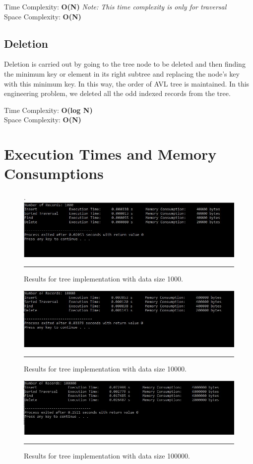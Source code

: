 	Time Complexity: \textbf{O(N)}   \textit{Note: This time complexity is only for traversal}\\
	Space Complexity: \textbf{O(N)}
	
	\subsection{Deletion}
	Deletion is carried out by going to the tree node to be deleted and then finding the minimum key or element in its right subtree and replacing the node's key with this minimum key. In this way, the order of AVL tree is maintained. In this engineering problem, we deleted all the odd indexed records from the tree.
	
	Time Complexity: \textbf{O(log N)} \\
	Space Complexity: \textbf{O(N)}
	
\section{Execution Times and Memory Consumptions}
\begin{figure}[H].
	\centering
	\includegraphics[scale =0.7]{./Figures/Tree1000.jpg}
	\rule{35em}{0.5pt}
	\caption{Results for tree implementation with data size 1000.}
	\label{fig:Tree 1000}
\end{figure}

\begin{figure}[H]
	\centering
	\includegraphics[scale =0.7]{./Figures/Tree10000.jpg}
	\rule{35em}{0.5pt}
	\caption{Results for tree implementation with data size 10000.}
	\label{fig:Tree 10000}
\end{figure}

\begin{figure}[H]
	\centering
	\includegraphics[scale =0.7]{./Figures/Tree100000.jpg}
	\rule{35em}{0.5pt}
	\caption{Results for tree implementation with data size 100000.}
	\label{fig:Tree 100000}
\end{figure}

